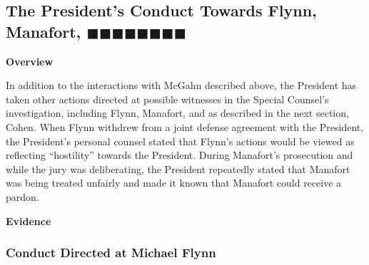 \subsection{The President's Conduct Towards Flynn, Manafort, $\blacksquare\blacksquare\blacksquare\blacksquare\blacksquare\blacksquare\blacksquare\blacksquare$}

\begin{center}
\textbf{Overview}
\end{center}

In addition to the interactions with McGahn described above, the President has taken other actions directed at possible witnesses in the Special Counsel's investigation, including Flynn, Manafort,  and as described in the next section, Cohen.
When Flynn withdrew from a joint defense agreement with the President, the President's personal counsel stated that Flynn's actions would be viewed as reflecting ``hostility'' towards the President.
During Manafort's prosecution and while the jury was deliberating, the President repeatedly stated that Manafort was being treated unfairly and made it known that Manafort could receive a pardon.

\begin{center}
\textbf{Evidence}
\end{center}

\subsubsection{Conduct Directed at Michael Flynn}


